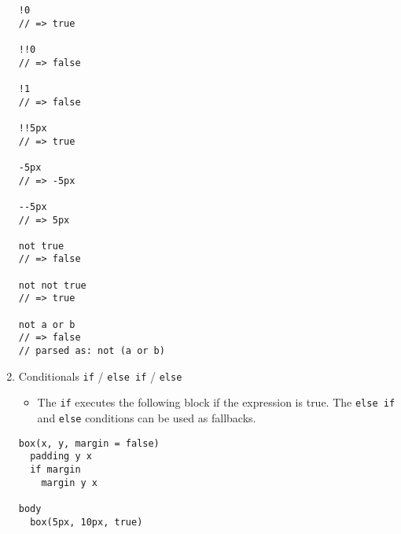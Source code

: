 \documentclass[10pt, twocolumn]{article}
\begin{document}
\begin{enumerate}
\begin{lstlisting}[frame=single]
!0
// => true

!!0
// => false

!1
// => false

!!5px
// => true

-5px
// => -5px

--5px
// => 5px

not true
// => false

not not true
// => true

not a or b
// => false
// parsed as: not (a or b)
\end{lstlisting}

\item Conditionals \texttt{if} / \texttt{else if} / \texttt{else}
\begin{itemize}
\item The \texttt{if} executes the following block if the expression is true.  The \texttt{else if} and \texttt{else} conditions can be used as fallbacks. 
\end{itemize}
\begin{lstlisting}[frame=single]
box(x, y, margin = false)
  padding y x
  if margin
    margin y x

body
  box(5px, 10px, true)
\end{lstlisting}

\end{enumerate}
\end{document}

